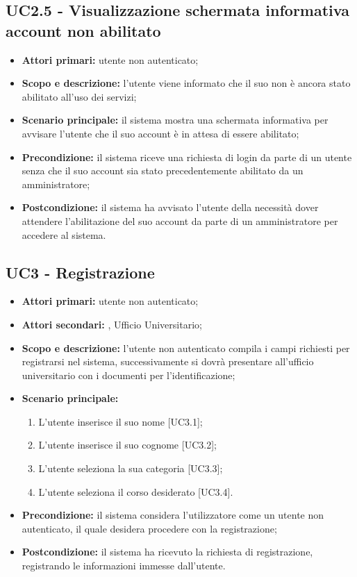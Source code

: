 \documentclass[AnalisiDeiRequisiti.tex]{subfiles}
\begin{document}
\subsection{UC2.5 - Visualizzazione schermata informativa account non abilitato}
\begin{itemize}
	\item \textbf{Attori primari:} utente non autenticato;
	\item \textbf{Scopo e descrizione:} l'utente viene informato che il suo  non è ancora stato abilitato all'uso dei servizi;
	\item \textbf{Scenario principale:} il sistema mostra una schermata informativa per avvisare l'utente che il suo account è in attesa di essere abilitato;
	\item \textbf{Precondizione:} il sistema riceve una richiesta di login da parte di un utente senza che il suo account sia stato precedentemente abilitato da un amministratore;
	\item \textbf{Postcondizione:} il sistema ha avvisato l'utente della necessità dover attendere l'abilitazione del suo account da parte di un amministratore per accedere al sistema.
\end{itemize}
\subsection{UC3 - Registrazione}
\begin{itemize}
	\item \textbf{Attori primari:} utente non autenticato;
	\item \textbf{Attori secondari:} , Ufficio Universitario;
	\item \textbf{Scopo e descrizione:} l'utente non autenticato compila i campi richiesti per registrarsi nel sistema, successivamente si dovrà presentare all'ufficio universitario con i documenti per l'identificazione;
	\item \textbf{Scenario principale:}
	\begin{enumerate}
		\item L'utente inserisce il suo nome [UC3.1];
		\item L'utente inserisce il suo cognome [UC3.2];
		\item L'utente seleziona la sua categoria [UC3.3];
		\item L'utente seleziona il corso desiderato [UC3.4].
	\end{enumerate}
	\item \textbf{Precondizione:} il sistema considera l'utilizzatore come un utente non autenticato, il quale desidera procedere con la registrazione;
	\item \textbf{Postcondizione:} il sistema ha ricevuto la richiesta di registrazione, registrando le informazioni immesse dall'utente.
\end{itemize}
\end{document}
